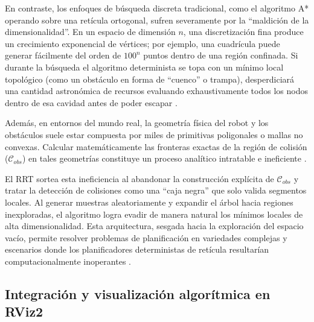 En contraste, los enfoques de búsqueda discreta tradicional, como el algoritmo A* operando 
sobre una retícula ortogonal, sufren severamente por la \enquote{maldición de la dimensionalidad}. En un espacio 
de dimensión $n$, una discretización fina produce un crecimiento exponencial de vértices; por 
ejemplo, una cuadrícula puede generar fácilmente del orden de $100^n$ puntos dentro de una 
región confinada. Si durante la búsqueda el algoritmo determinista se topa con un mínimo local topológico 
(como un obstáculo en forma de \enquote{cuenco} o trampa), desperdiciará una cantidad astronómica de 
recursos evaluando exhaustivamente todos los nodos dentro de esa cavidad antes de poder escapar \parencite{lavalle2006planning}.

Además, en entornos del mundo real, la geometría física del robot y los obstáculos suele estar 
compuesta por miles de primitivas poligonales o mallas no convexas. Calcular 
matemáticamente las fronteras exactas de la región de colisión ($\mathcal{C}_{obs}$) en 
tales geometrías constituye un proceso analítico intratable e ineficiente \parencite{lavalle2006planning}. 

El RRT sortea esta ineficiencia al abandonar la construcción explícita de $\mathcal{C}_{obs}$ 
y tratar la detección de colisiones como una \enquote{caja negra} que solo valida segmentos locales. 
Al generar muestras aleatoriamente y expandir el árbol hacia regiones inexploradas, 
el algoritmo logra evadir de manera natural los mínimos locales de alta dimensionalidad. 
Esta arquitectura, sesgada hacia la exploración del espacio vacío, permite resolver 
problemas de planificación en variedades complejas y escenarios donde los planificadores deterministas 
de retícula resultarían computacionalmente inoperantes \parencite{lavalle2006planning, Choset2005}.


\subsection{Integración y visualización algorítmica en RViz2}

